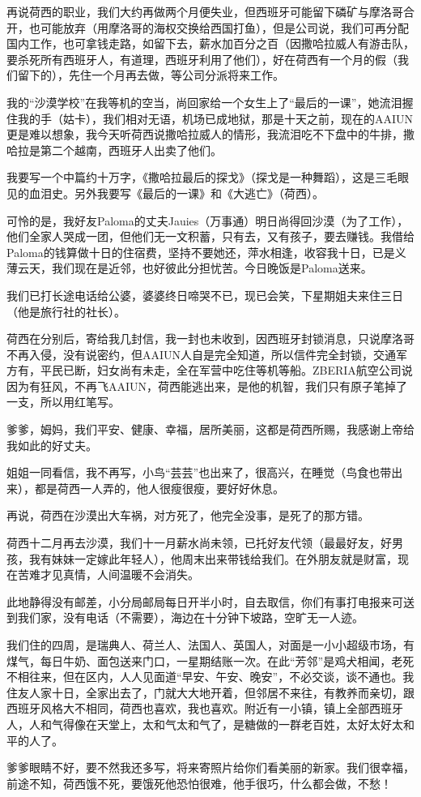 \par 再说荷西的职业，我们大约再做两个月便失业，但西班牙可能留下磷矿与摩洛哥合开，也可能放弃（用摩洛哥的海权交换给西国打鱼），但是公司说，我们可再分配国内工作，也可拿钱走路，如留下去，薪水加百分之百（因撒哈拉威人有游击队，要杀死所有西班牙人，有道理，西班牙利用了他们），好在荷西有一个月的假（我们留下的），先住一个月再去做，等公司分派将来工作。
\par 我的“沙漠学校”在我等机的空当，尚回家给一个女生上了“最后的一课”，她流泪握住我的手（姑卡），我们相对无语，机场已成地狱，那是十天之前，现在的AAIUN更是难以想象，我今天听荷西说撒哈拉威人的情形，我流泪吃不下盘中的牛排，撒哈拉是第二个越南，西班牙人出卖了他们。
\par 我要写一个中篇约十万字，《撒哈拉最后的探戈》（探戈是一种舞蹈），这是三毛眼见的血泪史。另外我要写《最后的一课》和《大逃亡》（荷西）。
\par 可怜的是，我好友Paloma的丈夫Jauies（万事通）明日尚得回沙漠（为了工作），他们全家人哭成一团，但他们无一文积蓄，只有去，又有孩子，要去赚钱。我借给Paloma的钱算做十日的住宿费，坚持不要她还，萍水相逢，收容我十日，已是义薄云天，我们现在是近邻，也好彼此分担忧苦。今日晚饭是Paloma送来。
\par 我们已打长途电话给公婆，婆婆终日啼哭不已，现已会笑，下星期姐夫来住三日（他是旅行社的社长）。
\par 荷西在分别后，寄给我几封信，我一封也未收到，因西班牙封锁消息，只说摩洛哥不再入侵，没有说密约，但AAIUN人自是完全知道，所以信件完全封锁，交通军方有，平民已断，妇女尚有未走，全在军营中吃住等机等船。ZBERIA航空公司说因为有狂风，不再飞AAIUN，荷西能逃出来，是他的机智，我们只有原子笔掉了一支，所以用红笔写。
\par 爹爹，姆妈，我们平安、健康、幸福，居所美丽，这都是荷西所赐，我感谢上帝给我如此的好丈夫。
\par 姐姐一同看信，我不再写，小鸟“芸芸”也出来了，很高兴，在睡觉（鸟食也带出来），都是荷西一人弄的，他人很瘦很瘦，要好好休息。
\par 再说，荷西在沙漠出大车祸，对方死了，他完全没事，是死了的那方错。
\par 荷西十二月再去沙漠，我们十一月薪水尚未领，已托好友代领（最最好友，好男孩，我有妹妹一定嫁此年轻人），他周末出来带钱给我们。在外朋友就是财富，现在苦难才见真情，人间温暖不会消失。
\par 此地静得没有邮差，小分局邮局每日开半小时，自去取信，你们有事打电报来可送到我们家，没有电话（不需要），海边在十分钟下坡路，空旷无一人迹。
\par 我们住的四周，是瑞典人、荷兰人、法国人、英国人，对面是一小小超级市场，有煤气，每日牛奶、面包送来门口，一星期结账一次。在此“芳邻”是鸡犬相闻，老死不相往来，但在区内，人人见面道“早安、午安、晚安”，不必交谈，谈不通也。我住友人家十日，全家出去了，门就大大地开着，但邻居不来往，有教养而亲切，跟西班牙风格大不相同，荷西也喜欢，我也喜欢。附近有一小镇，镇上全部西班牙人，人和气得像在天堂上，太和气太和气了，是糖做的一群老百姓，太好太好太和平的人了。
\par 爹爹眼睛不好，要不然我还多写，将来寄照片给你们看美丽的新家。我们很幸福，前途不知，荷西饿不死，要饿死他恐怕很难，他手很巧，什么都会做，不愁！
\par  
\par {}


